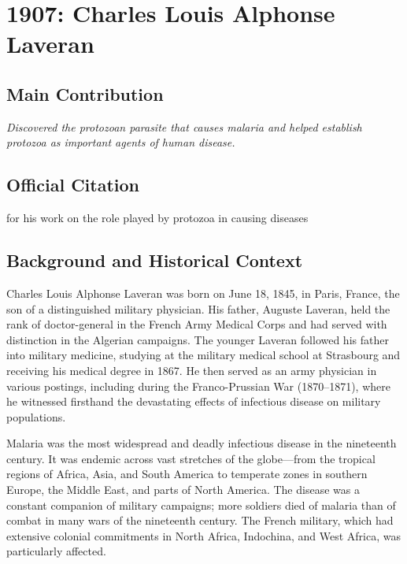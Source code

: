 \chapter[1907 --- Laveran]{1907: Charles Louis Alphonse Laveran}
\label{ch:1907_charleslouisalphonselaveran}

\section*{Main Contribution}

\textit{Discovered the protozoan parasite that causes malaria and helped establish protozoa as important agents of human disease.}\cite{nobel-1907,lecture-1907}

\section{Official Citation}

for his work on the role played by protozoa in causing diseases

\section{Background and Historical Context}

Charles Louis Alphonse Laveran was born on June 18, 1845, in Paris, France, the son of a distinguished military physician. His father, Auguste Laveran, held the rank of doctor-general in the French Army Medical Corps and had served with distinction in the Algerian campaigns. The younger Laveran followed his father into military medicine, studying at the military medical school at Strasbourg and receiving his medical degree in 1867. He then served as an army physician in various postings, including during the Franco-Prussian War (1870--1871), where he witnessed firsthand the devastating effects of infectious disease on military populations.

Malaria was the most widespread and deadly infectious disease in the nineteenth century. It was endemic across vast stretches of the globe---from the tropical regions of Africa, Asia, and South America to temperate zones in southern Europe, the Middle East, and parts of North America. The disease was a constant companion of military campaigns; more soldiers died of malaria than of combat in many wars of the nineteenth century. The French military, which had extensive colonial commitments in North Africa, Indochina, and West Africa, was particularly affected.

